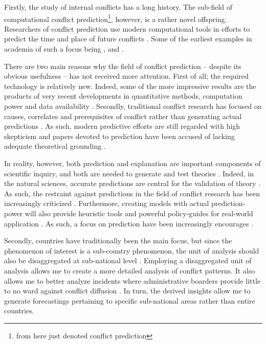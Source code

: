 \documentclass[a4paper]{article}
\begin{document}
Firstly, the study of internal conflicts has a long history. The sub-field of computational conflict prediction\footnote{from here just denoted conflict prediction}, however, is a rather novel offspring. Researchers of conflict prediction use modern computational tools in efforts to predict the time and place of future conflicts \citep{cederman2017predicting, chadefaux2017conflict}. Some of the earliest examples in academia of such a focus being \cite{Goldstone_2010}, \cite{Hegre2013} and \cite{perry_2013}.\par

There are two main reasons why the field of conflict prediction -- despite its obvious usefulness -- has not received more attention. First of all; the required technology is relatively new. Indeed, some of the more impressive results are the products of very recent developments in quantitative methods, computation power and data availability \citep{ol2010afghanistan, perry_2013}. Secondly, traditional conflict research has focused on causes, correlates and prerequisites of conflict rather than generating actual predictions \citep[8]{chadefaux2017conflict}. As such, modern predictive efforts are still regarded with high skepticism and papers devoted to prediction have been accused of lacking adequate theoretical grounding \citep[8-9]{chadefaux2017conflict}. 

In reality, however, both prediction and explanation are important components of scientific inquiry, and both are needed to generate and test theories \citep{Schrodt_2014, chadefaux2017conflict}. Indeed, in the natural sciences, accurate predictions are central for the validation of theory \citep[289]{Schrodt_2014}. As such, the restraint against predictions in the field of conflict research has been increasingly criticized \citep{King_Zeng_2001, Ward_Greenhill_Bakke_2010, Goldstone_2010, Schrodt_2014, chadefaux2017conflict}. Furthermore, creating models with actual prediction-power will also provide heuristic tools and powerful policy-guides for real-world application \citep[372]{Ward_Greenhill_Bakke_2010}. As such, a focus on prediction have been increasingly encourages \citep{Ward_Greenhill_Bakke_2010, Schrodt_2014}.\par

Secondly, countries have traditionally been the main focus, but since the phenomenon of interest is a sub-country phenomenon, the unit of analysis should also be disaggregated at sub-national level \citep[490]{Cederman_Gleditsch_2009}. Employing a disaggregated unit of analysis allows me to create a more detailed analysis of conflict patterns. It also allows me to better analyze incidents where administrative boarders provide little to no ward against conflict diffusion \citep[445-446]{ol2010afghanistan}. In turn, the derived insights allow me to generate forecastings pertaining to specific sub-national areas rather than entire countries.\par
\end{document}
